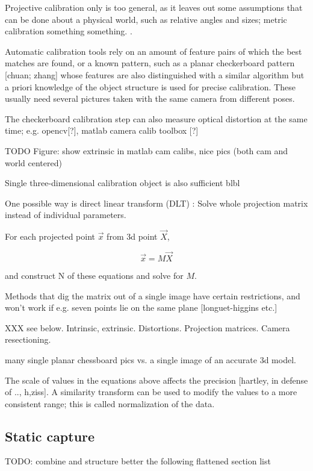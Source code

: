 Projective calibration only is too general, as it leaves out some assumptions that can be done about a physical world, such as relative angles and sizes; metric calibration something something. \cite{zisserman1995metric}.

Automatic calibration tools rely on an amount of feature pairs of which the best matches are found, or a known pattern, such as a planar checkerboard pattern [chuan; zhang] whose features are also distinguished with a similar algorithm but a priori knowledge of the object structure is used for precise calibration.
These usually need several pictures taken with the same camera from different poses.

The checkerboard calibration step can also measure optical distortion at the same time; e.g. opencv[?], matlab camera calib toolbox [?]

TODO Figure: show extrinsic in matlab cam calibs, nice pics (both cam and world centered)

Single three-dimensional calibration object is also sufficient blbl

One possible way is direct linear transform (DLT)
\cite{hartley03multiview}: Solve whole projection matrix instead of individual parameters.

For each projected point $\vec x$ from 3d point $\vec X$,

\[
	\vec x = M \vec X
\]

and construct N of these equations and solve for $M$.

Methods that dig the matrix out of a single image have certain restrictions, and won't work if e.g. seven points lie on the same plane [longuet-higgins etc.]

XXX see below. Intrinsic, extrinsic. Distortions. Projection matrices. Camera resectioning.

many single planar chessboard pics vs. a single image of an accurate 3d model.

The scale of values in the equations above affects the precision [hartley, in defense of .., h,ziss]. A similarity transform can be used to modify the values to a more consistent range; this is called normalization of the data.

\subsection{Static capture}

TODO: combine and structure better the following flattened section list

